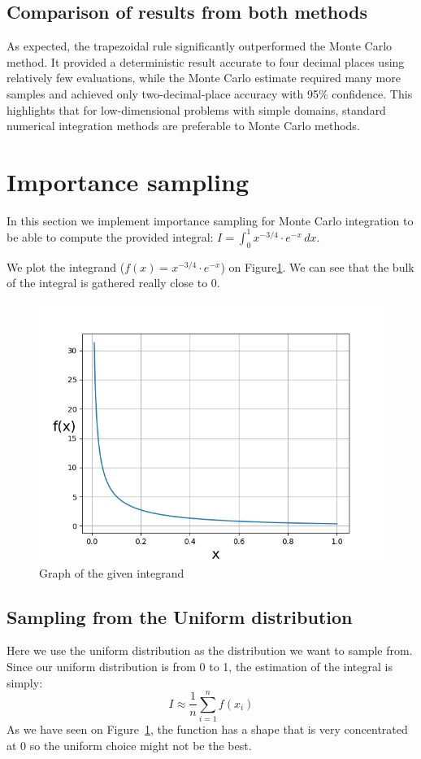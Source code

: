 \documentclass[9pt]{IEEEtran}
\begin{document}
 \subsection{Comparison of results from both methods}
As expected, the trapezoidal rule significantly outperformed the Monte Carlo
 method. It provided a deterministic result accurate to four decimal places 
 using relatively few evaluations, while the Monte Carlo estimate required 
 many more samples and achieved only two-decimal-place accuracy with 95\%
  confidence. This highlights that for low-dimensional problems with simple
   domains, standard numerical integration methods are preferable to Monte 
   Carlo methods.

\section{Importance sampling}
In this section we implement importance sampling for Monte Carlo integration
 to be able to compute the provided integral:
 $I = \int_0^1 x^{-3/4} \cdot e^{-x} \, dx$.

We plot the integrand ($f(x) = x^{-3/4} \cdot e^{-x}$) on Figure\ref{fig:lin}. We can see that 
the bulk of the integral is gathered really close to 0.


    \begin{figure}[h]
        \centering
        \includegraphics[width=0.99\columnwidth]{figures/f}
        \caption{Graph of the given integrand}
        \label{fig:lin}
    \end{figure}

 \subsection{Sampling from the Uniform distribution}
 Here we use the uniform distribution as the distribution we want to sample from.
 Since our uniform distribution is from 0 to 1, the estimation of the integral is
 simply: 
 \[
I \approx \frac{1}{n} \sum_{i=1}^{n} f(x_i)
\]
As we have seen on Figure~\ref{fig:lin}, the function has a shape that is very concentrated at 
0 so the uniform choice might not be the best. 
\end{document}
